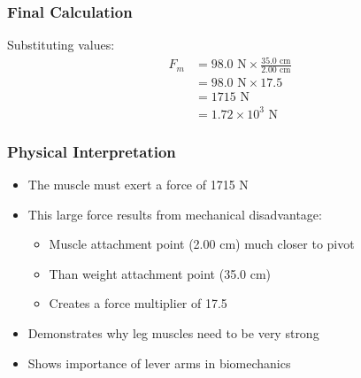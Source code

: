 \documentclass{beamer}
\begin{document}
\begin{frame}
\frametitle{Final Calculation}
Substituting values:
\begin{align*}
F_m &= 98.0\text{ N} \times \frac{35.0\text{ cm}}{2.00\text{ cm}}\\
&= 98.0\text{ N} \times 17.5\\
&= 1715\text{ N}\\
&= 1.72 \times 10^3\text{ N}
\end{align*}
\end{frame}

\begin{frame}
\frametitle{Physical Interpretation}
\begin{itemize}
    \item The muscle must exert a force of 1715 N 
    \item This large force results from mechanical disadvantage:
    \begin{itemize}
        \item Muscle attachment point (2.00 cm) much closer to pivot
        \item Than weight attachment point (35.0 cm)
        \item Creates a force multiplier of 17.5
    \end{itemize}
    \item Demonstrates why leg muscles need to be very strong
    \item Shows importance of lever arms in biomechanics
\end{itemize}
\end{frame}
\end{document}
